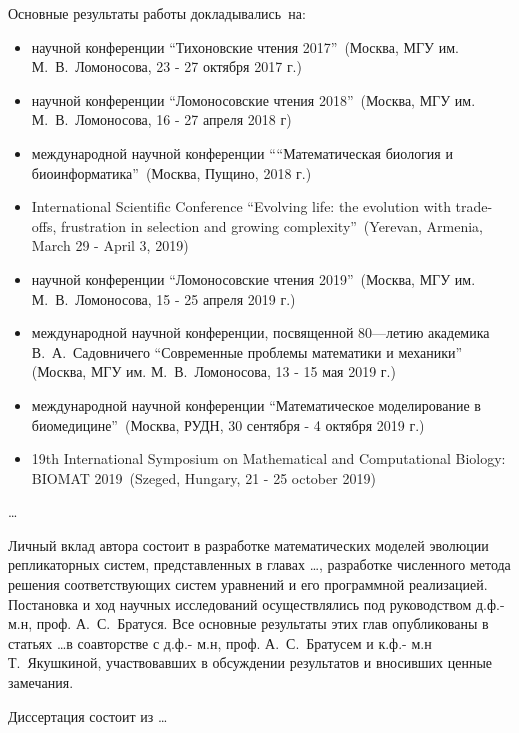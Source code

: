 {\probation}
Основные результаты работы докладывались~на:
\begin{itemize}

\item  научной конференции ``Тихоновские чтения 2017''\, (Москва, МГУ им. М.~В.~Ломоносова, 23 - 27 октября 2017 г.)

\item  научной конференции ``Ломоносовские чтения 2018''\, (Москва, МГУ им. М.~В.~Ломоносова, 16 - 27 апреля 2018 г)

\item  международной научной конференции ``“Математическая биология и биоинформатика''\, (Москва, Пущино, 2018 г.)

\item International Scientific Conference ``Evolving life: the evolution with trade-offs, frustration in selection and growing complexity''\, (Yerevan, Armenia, March 29 - April 3, 2019)

\item  научной конференции ``Ломоносовские чтения 2019''\, (Москва, МГУ им. М.~В.~Ломоносова, 15 - 25 апреля 2019 г.)

\item  международной научной конференции, посвященной 80---летию академика В.~А.~Садовничего ``Современные проблемы математики и механики''\, (Москва, МГУ им. М.~В.~Ломоносова, 13 - 15 мая 2019 г.)

\item  международной научной конференции ``Математическое моделирование в биомедицине''\, (Москва, РУДН, 30 сентября - 4 октября 2019 г.)

\item 19th International Symposium on Mathematical and Computational Biology: BIOMAT 2019\, (Szeged, Hungary, 21 - 25 october 2019)

\end{itemize}

{\publications} \ldots

{\contribution}
Личный вклад автора состоит в разработке математических моделей эволюции репликаторных систем, представленных в главах \ldots, разработке численного метода решения соответствующих систем уравнений и его программной реализацией. Постановка и ход научных исследований осуществлялись под руководством д.ф.- м.н, проф. А.~С.~Братуся. Все основные результаты этих глав опубликованы в статьях \ldots в соавторстве с д.ф.- м.н, проф. А.~С.~Братусем и к.ф.- м.н Т.~Якушкиной, участвовавших в обсуждении результатов и вносивших ценные замечания. 

{\volumeAndStructureWork}
Диссертация состоит из \ldots





